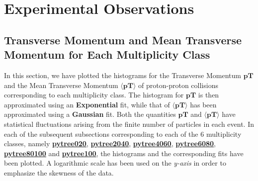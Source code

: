 \documentclass[letterpaper,aps,prc,superscriptaddress,nofootinbib,10pt,showpacs,floatfix]{revtex4-2}
\begin{document}
\vspace{-3mm}

\section{Experimental Observations }

\subsection{Transverse Momentum and Mean Transverse Momentum for Each Multiplicity Class}
In this section, we have plotted the histograms for the Transverse Momentum $\mathbf{pT}$ and the Mean Transverse Momentum $\mathbf{\langle pT\rangle }$ of proton-proton collisions corresponding to each multiplicity class. The histogram for $\mathbf{pT}$ is then approximated using an \textbf{Exponential} fit, while that of $\mathbf{\langle pT\rangle }$ has been approximated using a \textbf{Gaussian} fit. Both the quantities $\mathbf{pT}$ and $\mathbf{\langle pT\rangle }$ have statistical fluctuations arising from the finite number of particles in each event. In each of the subsequent subsections corresponding to each of the 6 multiplicity classes, namely \hyperref[subsubsec:020]{\textbf{pytree020}}, \hyperref[subsubsec:2040]{\textbf{pytree2040}}, \hyperref[subsubsec:4060]{\textbf{pytree4060}}, \hyperref[subsubsec:6080]{\textbf{pytree6080}}, \hyperref[subsubsec:80100]{\textbf{pytree80100}} and \hyperref[subsubsec:100]{\textbf{pytree100}}, the histograms and the corresponding fits have been plotted. A logarithmic scale has been used on the \emph{y-axis} in order to emphasize the skewness of the data. 
\end{document}
